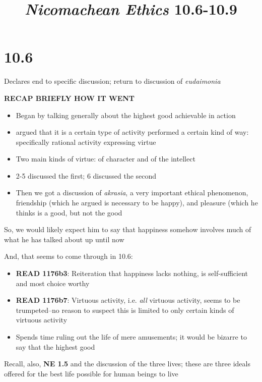 \documentclass[11pt]{article}
\title{\emph{Nicomachean Ethics} 10.6-10.9}
\author{}
\date{}
\begin{document}
\maketitle

\section{10.6}

\noindent Declares end to specific discussion; return to discussion of \emph{eudaimonia}
\vspace*{2mm}

\noindent \textbf{RECAP BRIEFLY HOW IT WENT}

\begin{itemize}\item{Began by talking generally about the highest good achievable in action}\item{argued that it is a certain type of activity performed a certain kind of way: specifically rational activity expressing virtue}\item{Two main kinds of virtue: of character and of the intellect}\item{2-5 discussed the first; 6 discussed the second}\item{Then we got a discussion of \emph{akrasia}, a very important ethical phenomenon, friendship (which he argued is necessary to be happy), and pleasure (which he thinks is a good, but not the good}\end{itemize} 

\noindent So, we would likely expect him to say that happiness somehow involves much of what he has talked about up until now
\vspace*{2mm}

\noindent And, that seems to come through in 10.6:

\begin{itemize}\item{\textbf{READ 1176b3}: Reiteration that happiness lacks nothing, is self-sufficient and most choice worthy}\item{\textbf{READ 1176b7}: Virtuous activity, i.e. \emph{all} virtuous activity, seems to be trumpeted--no reason to suspect this is limited to only certain kinds of virtuous activity}\item{Spends time ruling out the life of mere amusements; it would be bizarre to say that the highest good}\end{itemize}

\noindent Recall, also, \textbf{NE 1.5} and the discussion of the three lives; these are three ideals offered for the best life possible for human beings to live
\vspace*{2mm}
\end{document}
